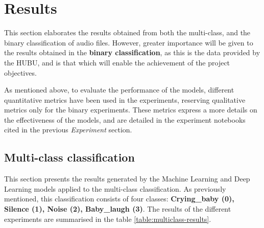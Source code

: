 \newpage
\section{Results}
This section elaborates the results obtained from both the multi-class, and the binary classification of audio files. However, greater importance will be given to the results obtained in the \textbf{binary classification}, as this is the data provided by the HUBU, and is that which will enable the achievement of the project objectives. 

As mentioned above, to evaluate the performance of the models, different quantitative metrics have been used in the experiments, reserving qualitative metrics only for the binary experiments. These metrics express a more details on the effectiveness of the models, and are detailed in the experiment notebooks cited in the previous \textit{Experiment} section.


\subsection{Multi-class classification}

This section presents the results generated by the Machine Learning and Deep Learning models applied to the multi-class classification. As previously mentioned, this classification consists of four classes: \textbf{Crying\_baby (0), Silence (1), Noise (2), Baby\_laugh (3)}. The results of the different experiments are summarised in the table \ref{table:multiclass-results}. 

